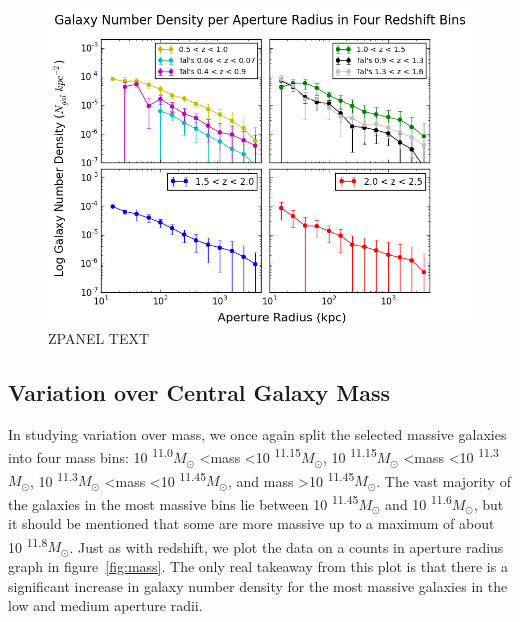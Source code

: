 \documentclass[apj]{emulateapj}
\begin{document}
\begin{figure}
\centering
\graphicspath{{C:/3d_hst/2015_finals/aperture_distance/}}
\includegraphics[width=\linewidth]{temp_zpanel_final}
\caption{\footnotesize ZPANEL TEXT}
\label{fig:zpanel}
\end{figure}

\subsection{Variation over Central Galaxy Mass}

In studying variation over mass, we once again split the selected massive galaxies into four mass bins: 10 \textsuperscript{11.0}$M_{\odot}$ \textless mass \textless 10 \textsuperscript{11.15}$M_{\odot}$, 10 \textsuperscript{11.15}$M_{\odot}$ \textless mass \textless 10 \textsuperscript{11.3}$M_{\odot}$, 10 \textsuperscript{11.3}$M_{\odot}$ \textless mass \textless 10 \textsuperscript{11.45}$M_{\odot}$, and mass \textgreater 10 \textsuperscript{11.45}$M_{\odot}$. The vast majority of the galaxies in the most massive bins lie between 10 \textsuperscript{11.45}$M_{\odot}$ and 10 \textsuperscript{11.6}$M_{\odot}$, but it should be mentioned that some are more massive up to a maximum of about 10 \textsuperscript{11.8}$M_{\odot}$. Just as with redshift, we plot the data on a counts in aperture radius graph in figure~\ref{fig:mass}. The only real takeaway from this plot is that there is a significant increase in galaxy number density for the most massive galaxies in the low and medium aperture radii.
\end{document}
